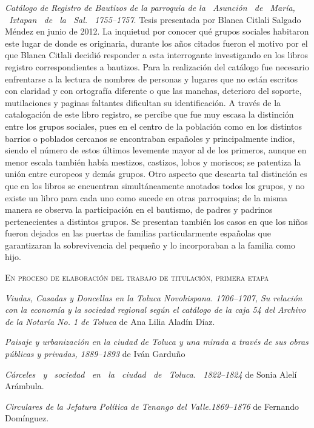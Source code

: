 \smallskip 
\noindent \textsl{Catálogo de Registro de Bautizos de la 
parroquia de la \ Asunción \ de \ María, \ Ixtapan \ de \ la \ Sal. \ 1755--1757}. 
Tesis presentada por Blanca Citlali Salgado Méndez en junio de 2012. La 
inquietud por conocer qué grupos sociales habitaron este lugar de donde 
es originaria, durante los años citados fueron el motivo por el que 
Blanca Citlali decidió responder a esta interrogante investigando en 
los libros registro correspondientes a bautizos. Para la realización 
del catálogo fue necesario enfrentarse a la lectura de nombres de 
personas y lugares que no están escritos con claridad y con ortografía 
diferente o que las manchas, deterioro del soporte, mutilaciones y 
paginas faltantes dificultan su identificación. A través de la 
catalogación de este libro registro, se percibe que fue  muy escasa la 
distinción  entre los grupos sociales, pues en el centro de la 
población como en los distintos barrios o poblados cercanos se 
encontraban españoles y principalmente indios, siendo el número de estos 
últimos levemente mayor al de los primeros, aunque en menor escala también 
había mestizos, castizos, lobos y moriscos; se patentiza  la unión 
entre europeos y demás grupos. Otro aspecto que descarta tal distinción 
es que en los libros se encuentran simultáneamente anotados todos los 
grupos, y no existe un libro para cada uno como sucede en otras 
parroquias; de la misma manera se observa la participación en el bautismo, de 
padres y padrinos pertenecientes a distintos grupos. Se presentan 
también los casos en que los niños fueron dejados en las puertas de 
familias particularmente españolas que garantizaran la sobrevivencia 
del pequeño y lo incorporaban a la familia como hijo.

\medskip
\noindent \textsc{En proceso de elaboración del trabajo de titulación, 
primera etapa}

\smallskip 
\noindent \textsl{Viudas, Casadas y Doncellas en la Toluca 
Novohispana. 1706--1707, Su relación con la economía y la sociedad 
regional según el catálogo de la caja 54 del Archivo de la Notaría No. 
1 de Toluca} de Ana Lilia Aladín Díaz.

\noindent \textsl{Paisaje y urbanización en la ciudad de Toluca y una 
mirada a través de sus obras públicas y privadas, 1889--1893} de Iván 
Garduño

\noindent \textsl{Cárceles \ y \ sociedad \ en \ la \ ciudad \ de \ Toluca. \ 
1822--1824} de Sonia Alelí Arámbula.

\noindent \textsl{Circulares de la Jefatura Política de Tenango del 
Valle.1869--1876} de Fernando Domínguez.

